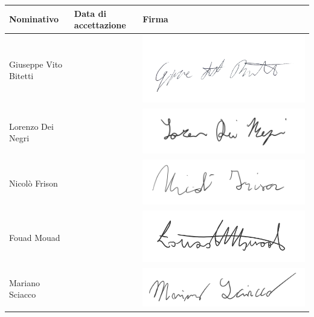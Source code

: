 			\begin{table}[h!]
				\centering
				\begin{tabular}{|l|l|l|}
					\hline
					\textbf{Nominativo} & \textbf{Data di accettazione} & \textbf{Firma} \\ \hline
					Giuseppe Vito Bitetti & & \includegraphics[scale=0.1]{images/firme/peppe} \\ \hline
					Lorenzo Dei Negri & & \includegraphics[scale=0.6]{images/firme/lorenzo} \\ \hline
					Nicolò Frison & & \includegraphics[scale=0.6]{images/firme/nicolo} \\ \hline
					Fouad Mouad & & \includegraphics[scale=0.6]{images/firme/fouad} \\ \hline
					Mariano Sciacco & & \includegraphics[scale=0.6]{images/firme/mariano}  \\ \hline

\end{tabular}
\end{table}
